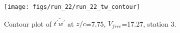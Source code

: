 \begin{figure}[H]
\centering
\texttt{[image: figs/run\_22/run\_22\_tw\_contour]}
\caption{Contour plot of $\overline{t^\prime w^\prime}$ at $z/c$=7.75, $V_{free}$=17.27, station 3.}
\label{fig:run_22_tw_contour}
\end{figure}


